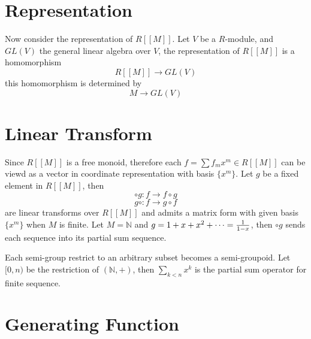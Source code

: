 \documentclass{article}
\begin{document}
\section{Representation}
Now consider the representation of $R[[M]]$.
Let $V$ be a $R$-module, and $GL(V)$ the general linear algebra over $V$,
the representation of $R[[M]]$ is a homomorphism
$$R[[M]] \to GL(V)$$
this homomorphism is determined by
$$M \to GL(V)$$

\section{Linear Transform}
Since $R[[M]]$ is a free monoid, therefore each $f = \sum f_m x^m \in R[[M]]$
can be viewd as a vector in coordinate representation with basis $\{x^m\}$.
Let $g$ be a fixed element in $R[[M]]$, then
$$\circ g : f \to f \circ g$$
$$g \circ : f \to g \circ f$$
are linear transforms over $R[[M]]$ and admits a matrix form with given basis $\{x^m\}$ when $M$ is finite.
Let $M = \mathbb N$ and $g = 1 + x + x^2 + \dots = {1 \over 1 - x}$, then
$\circ g$ sends each sequence into its partial sum sequence.

Each semi-group restrict to an arbitrary subset becomes a semi-groupoid.
Let $[0, n)$ be the restriction of $(\mathbb N, +)$, then $\sum_{k < n} x^k$
is the partial sum operator for finite sequence.

\section{Generating Function}
\end{document}
